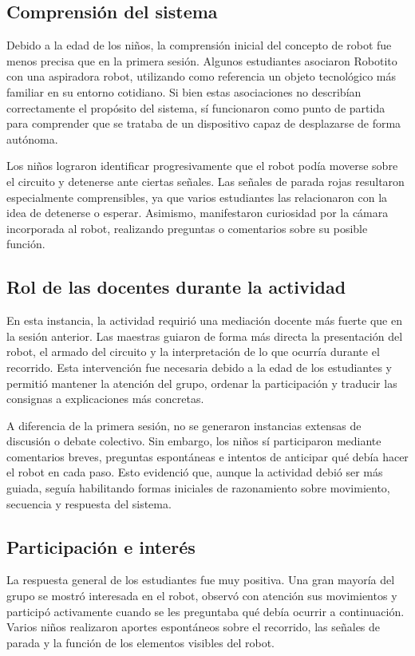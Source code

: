 \documentclass{prgrado}
\begin{document}
\subsection{Comprensión del sistema}
Debido a la edad de los niños, la comprensión inicial del concepto de robot fue menos precisa que en la primera sesión. Algunos estudiantes asociaron Robotito con una aspiradora robot, utilizando como referencia un objeto tecnológico más familiar en su entorno cotidiano. Si bien estas asociaciones no describían correctamente el propósito del sistema, sí funcionaron como punto de partida para comprender que se trataba de un dispositivo capaz de desplazarse de forma autónoma.

Los niños lograron identificar progresivamente que el robot podía moverse sobre el circuito y detenerse ante ciertas señales. Las señales de parada rojas resultaron especialmente comprensibles, ya que varios estudiantes las relacionaron con la idea de detenerse o esperar. Asimismo, manifestaron curiosidad por la cámara incorporada al robot, realizando preguntas o comentarios sobre su posible función.
\subsection{Rol de las docentes durante la actividad}
En esta instancia, la actividad requirió una mediación docente más fuerte que en la sesión anterior. Las maestras guiaron de forma más directa la presentación del robot, el armado del circuito y la interpretación de lo que ocurría durante el recorrido. Esta intervención fue necesaria debido a la edad de los estudiantes y permitió mantener la atención del grupo, ordenar la participación y traducir las consignas a explicaciones más concretas.

A diferencia de la primera sesión, no se generaron instancias extensas de discusión o debate colectivo. Sin embargo, los niños sí participaron mediante comentarios breves, preguntas espontáneas e intentos de anticipar qué debía hacer el robot en cada paso. Esto evidenció que, aunque la actividad debió ser más guiada, seguía habilitando formas iniciales de razonamiento sobre movimiento, secuencia y respuesta del sistema.
\subsection{Participación e interés}
La respuesta general de los estudiantes fue muy positiva. Una gran mayoría del grupo se mostró interesada en el robot, observó con atención sus movimientos y participó activamente cuando se les preguntaba qué debía ocurrir a continuación. Varios niños realizaron aportes espontáneos sobre el recorrido, las señales de parada y la función de los elementos visibles del robot.
\end{document}
